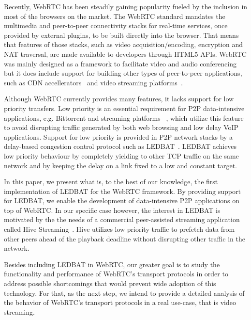 \documentclass{sig-alternate}
\begin{document}

Recently, WebRTC has been steadily gaining popularity fueled by the inclusion in most of
the browsers on the market. The WebRTC standard mandates the multimedia and peer-to-peer
connectivity stacks for real-time services, once provided by external plugins, to be built
directly into the browser. That means that features of those stacks, such as video
acquisition/encoding, encryption and NAT traversal, are made available to developers
through HTML5 APIs. WebRTC was mainly designed as a framework to facilitate video and
audio conferencing but it does include support for building other types of peer-to-peer
applications, such as CDN accellerators~\cite{peerCDN} and video streaming
platforms~\cite{nurminen2013p2p}.

Although WebRTC currently provides many features, it lacks support for low priority
transfers. Low priority is an essential requirement for P2P data-intensive applications,
e.g. Bittorrent and streaming platforms ~\cite{smoothcache}, which utilize this feature to
avoid disrupting traffic generated by both web browsing and low delay VoIP applications.
Support for low priority is provided in P2P network stacks by a delay-based congestion
control protocol such as LEDBAT~\cite{ledbat}. LEDBAT achieves low priority behaviour by
completely yielding to other TCP traffic on the same network and by keeping the delay on a
link fixed to a low and constant target.

In this paper, we present what is, to the best of our knowledge, the first implementation
of LEDBAT for the WebRTC framework. By providing support for LEDBAT, we enable the
development of data-intensive P2P applications on top of WebRTC. In our specific case
however, the interest in LEDBAT is motivated by the the needs of a commercial
peer-assisted streaming application called Hive Streaming~\cite{hive}. Hive utilizes low
priority traffic to prefetch data from other peers ahead of the playback deadline without
disrupting other traffic in the network.

Besides including LEDBAT in WebRTC, our greater goal is to study the functionality and
performance of WebRTC's transport protocols in order to address possible shortcomings that
would prevent wide adoption of this technology. For that, as the next step, we intend to
provide a detailed analysis of the behavior of WebRTC's transport protocols in a real
use-case, that is video streaming.
\end{document}

